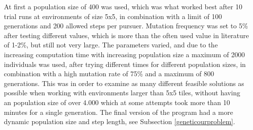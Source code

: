 At first a population size of 400 was used, which was what worked best after 10 trial runs at environments of size 5x5, in combination with a limit of 100 generations and 200 allowed steps per pursuer. Mutation frequency was set to 5\% after testing different values, which is more than the often used value in literature \cite{GAHandbook2} of 1-2\%, but still not very large. The parameters varied, and due to the increasing computation time with increasing population size a maximum of 2000 individuals was used, after trying different times for different population sizes, in combination with a high mutation rate of 75\% and a maximum of 800 generations. This was in order to examine as many different feasible solutions as possible when working with environments larger than 5x5 tiles, without having an population size of over 4.000 which at some attempts took more than 10 minutes for a single generation. The final version of the program had a more dynamic population size and step length, see Subsection \ref{geneticourproblem}.
